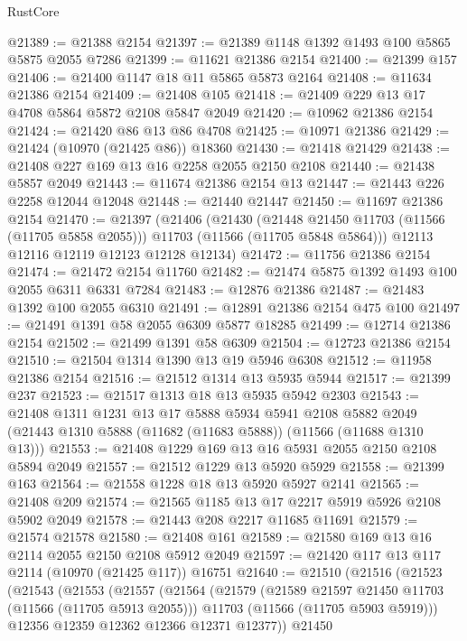 \begin{lexlean}{RustCore}
\begin{coremodule}
@21389 := @21388 @2154
@21397 := @21389 @1148 @1392 @1493 @100 @5865 @5875 @2055 @7286
@21399 := @11621 @21386 @2154
@21400 := @21399 @157
@21406 := @21400 @1147 @18 @11 @5865 @5873 @2164
@21408 := @11634 @21386 @2154
@21409 := @21408 @105
@21418 := @21409 @229 @13 @17 @4708 @5864 @5872 @2108 @5847 @2049
@21420 := @10962 @21386 @2154
@21424 := @21420 @86 @13 @86 @4708
@21425 := @10971 @21386
@21429 := @21424 (@10970 (@21425 @86)) @18360
@21430 := @21418 @21429
@21438 := @21408 @227 @169 @13 @16 @2258 @2055 @2150 @2108
@21440 := @21438 @5857 @2049
@21443 := @11674 @21386 @2154 @13
@21447 := @21443 @226 @2258 @12044 @12048
@21448 := @21440 @21447
@21450 := @11697 @21386 @2154
@21470 := @21397
    (@21406
      (@21430
        (@21448 @21450 @11703 (@11566 (@11705 @5858 @2055)))
        @11703
        (@11566 (@11705 @5848 @5864)))
      @12113
      @12116
      @12119
      @12123
      @12128
      @12134)
@21472 := @11756 @21386 @2154
@21474 := @21472 @2154 @11760
@21482 := @21474 @5875 @1392 @1493 @100 @2055 @6311 @6331 @7284
@21483 := @12876 @21386
@21487 := @21483 @1392 @100 @2055 @6310
@21491 := @12891 @21386 @2154 @475 @100
@21497 := @21491 @1391 @58 @2055 @6309 @5877 @18285
@21499 := @12714 @21386 @2154
@21502 := @21499 @1391 @58 @6309
@21504 := @12723 @21386 @2154
@21510 := @21504 @1314 @1390 @13 @19 @5946 @6308
@21512 := @11958 @21386 @2154
@21516 := @21512 @1314 @13 @5935 @5944
@21517 := @21399 @237
@21523 := @21517 @1313 @18 @13 @5935 @5942 @2303
@21543 := @21408
    @1311
    @1231
    @13
    @17
    @5888
    @5934
    @5941
    @2108
    @5882
    @2049
    (@21443 @1310 @5888 (@11682 (@11683 @5888)) (@11566 (@11688 @1310 @13)))
@21553 := @21408 @1229 @169 @13 @16 @5931 @2055 @2150 @2108 @5894 @2049
@21557 := @21512 @1229 @13 @5920 @5929
@21558 := @21399 @163
@21564 := @21558 @1228 @18 @13 @5920 @5927 @2141
@21565 := @21408 @209
@21574 := @21565 @1185 @13 @17 @2217 @5919 @5926 @2108 @5902 @2049
@21578 := @21443 @208 @2217 @11685 @11691
@21579 := @21574 @21578
@21580 := @21408 @161
@21589 := @21580 @169 @13 @16 @2114 @2055 @2150 @2108 @5912 @2049
@21597 := @21420 @117 @13 @117 @2114 (@10970 (@21425 @117)) @16751
@21640 := @21510
    (@21516
      (@21523
        (@21543
          (@21553
            (@21557
              (@21564
                (@21579
                  (@21589 @21597 @21450 @11703 (@11566 (@11705 @5913 @2055)))
                  @11703
                  (@11566 (@11705 @5903 @5919)))
                @12356
                @12359
                @12362
                @12366
                @12371
                @12377))
            @21450

\end{coremodule}
\end{lexlean}
